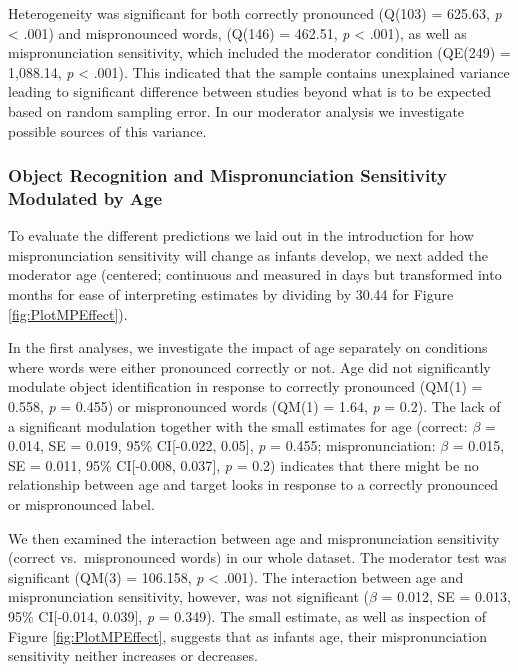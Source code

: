 \documentclass[man, noextraspace]{apa6}
\begin{document}
Heterogeneity was significant for both correctly pronounced (Q(103) = 625.63, \emph{p} \textless{} .001) and mispronounced words, (Q(146) = 462.51, \emph{p} \textless{} .001), as well as mispronunciation sensitivity, which included the moderator condition (QE(249) = 1,088.14, \emph{p} \textless{} .001). This indicated that the sample contains unexplained variance leading to significant difference between studies beyond what is to be expected based on random sampling error. In our moderator analysis we investigate possible sources of this variance.

\hypertarget{object-recognition-and-mispronunciation-sensitivity-modulated-by-age}{%
\subsubsection{Object Recognition and Mispronunciation Sensitivity Modulated by Age}\label{object-recognition-and-mispronunciation-sensitivity-modulated-by-age}}

To evaluate the different predictions we laid out in the introduction for how mispronunciation sensitivity will change as infants develop, we next added the moderator age (centered; continuous and measured in days but transformed into months for ease of interpreting estimates by dividing by 30.44 for Figure \ref{fig:PlotMPEffect}).

In the first analyses, we investigate the impact of age separately on conditions where words were either pronounced correctly or not. Age did not significantly modulate object identification in response to correctly pronounced (QM(1) = 0.558, \emph{p} = 0.455) or mispronounced words (QM(1) = 1.64, \emph{p} = 0.2). The lack of a significant modulation together with the small estimates for age (correct: \(\beta\) = 0.014, SE = 0.019, 95\% CI{[}-0.022, 0.05{]}, \emph{p} = 0.455; mispronunciation: \(\beta\) = 0.015, SE = 0.011, 95\% CI{[}-0.008, 0.037{]}, \emph{p} = 0.2) indicates that there might be no relationship between age and target looks in response to a correctly pronounced or mispronounced label.

We then examined the interaction between age and mispronunciation sensitivity (correct vs.~mispronounced words) in our whole dataset. The moderator test was significant (QM(3) = 106.158, \emph{p} \textless{} .001). The interaction between age and mispronunciation sensitivity, however, was not significant (\(\beta\) = 0.012, SE = 0.013, 95\% CI{[}-0.014, 0.039{]}, \emph{p} = 0.349). The small estimate, as well as inspection of Figure \ref{fig:PlotMPEffect}, suggests that as infants age, their mispronunciation sensitivity neither increases or decreases.
\end{document}
